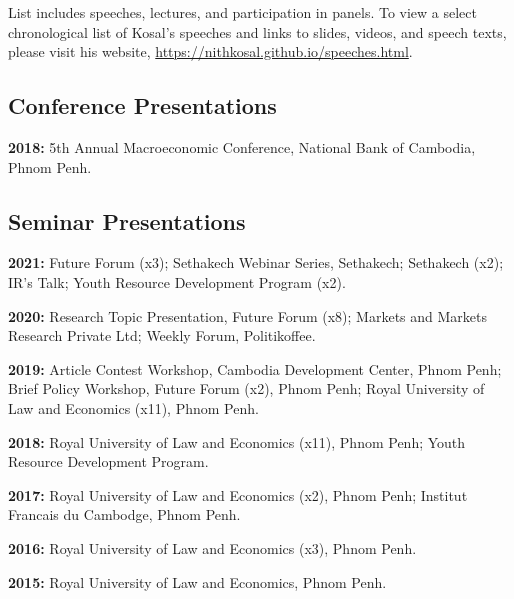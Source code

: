 \documentclass[10pt,a4paper]{article}
\begin{document}
\noindent List includes speeches, lectures, and participation in panels. To view a select chronological list of Kosal's speeches and links to slides, videos, and speech texts, please visit his website, \url{https://nithkosal.github.io/speeches.html}.

\vspace{-0.5em}
	
	\subsection*{Conference Presentations}
		\vspace{-1em}
			\begin{adjustwidth}{.7cm}{}
				 
				\item \textbf{2018:} 5th Annual Macroeconomic Conference, National Bank of Cambodia, Phnom Penh. 
			\end{adjustwidth}		
	
	\subsection*{Seminar Presentations}
			\vspace{-1em}
			\begin{adjustwidth}{.7cm}{}
				\item \textbf{2021:} Future Forum (x3); Sethakech Webinar Series, Sethakech; Sethakech (x2); IR’s Talk; Youth Resource Development Program (x2). 
								
				\item \textbf{2020:} Research Topic Presentation, Future Forum (x8); Markets and Markets Research Private Ltd; Weekly Forum, Politikoffee. 
				
				\item \textbf{2019:} Article Contest Workshop, Cambodia Development Center, Phnom Penh; Brief Policy Workshop, Future Forum (x2), Phnom Penh; Royal University of Law and Economics (x11), Phnom Penh.
		
				\item \textbf{2018:} Royal University of Law and Economics (x11), Phnom Penh; Youth Resource Development Program.
		
				\item \textbf{2017:} Royal University of Law and Economics (x2), Phnom Penh; Institut Francais du Cambodge, Phnom Penh.
		
				\item \textbf{2016:} Royal University of Law and Economics (x3), Phnom Penh.
		
				\item  \textbf{2015:} Royal University of Law and Economics, Phnom Penh.
			\end{adjustwidth}
\end{document}
